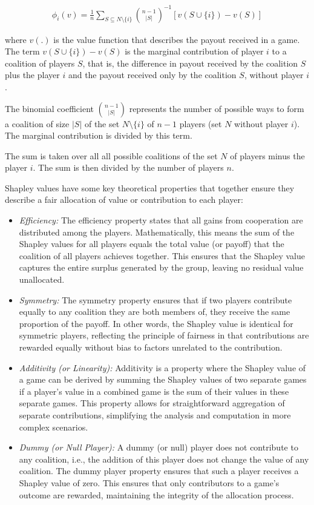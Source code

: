 \begin{align*}
\phi_i(v) = \frac{1}{n} \sum_{S \subseteq N \setminus \{i\}} \binom{n-1}{|S|}^{-1} \left[ v(S \cup \{i\}) - v(S)\right]
\end{align*}

where $v(.)$ is the value function that describes the payout received in a game. The term $v(S \cup \{i\}) - v(S)$ is the marginal contribution of player $i$ to a coalition of players $S$, that is, the difference in payout received by the coalition $S$ plus the player $i$ and the payout received only by the coalition $S$, without player $i$. 

The binomial coefficient $\binom{n-1}{|S|}$ represents the number of possible ways to form a coalition of size $|S|$ of the set $N \setminus \{i\}$ of $n-1$ players (set $N$ without player $i$). The marginal contribution is divided by this term. 

The sum is taken over all all possible coalitions of the set $N$ of players minus the player $i$. The sum is then divided by the number of players $n$.

Shapley values have some key theoretical properties that together ensure they describe a fair allocation of value or contribution to each player:

\begin{itemize}
    \item \emph{Efficiency:}
    The efficiency property states that all gains from cooperation are distributed among the players. Mathematically, this means the sum of the Shapley values for all players equals the total value (or payoff) that the coalition of all players achieves together. This ensures that the Shapley value captures the entire surplus generated by the group, leaving no residual value unallocated.

    \item \emph{Symmetry:}
    The symmetry property ensures that if two players contribute equally to any coalition they are both members of, they receive the same proportion of the payoff. In other words, the Shapley value is identical for symmetric players, reflecting the principle of fairness in that contributions are rewarded equally without bias to factors unrelated to the contribution.

    \item \emph{Additivity (or Linearity):}
    Additivity is a property where the Shapley value of a game can be derived by summing the Shapley values of two separate games if a player's value in a combined game is the sum of their values in these separate games. This property allows for straightforward aggregation of separate contributions, simplifying the analysis and computation in more complex scenarios.

    \item \emph{Dummy (or Null Player):}
    A dummy (or null) player does not contribute to any coalition, i.e., the addition of this player does not change the value of any coalition. The dummy player property ensures that such a player receives a Shapley value of zero. This ensures that only contributors to a game's outcome are rewarded, maintaining the integrity of the allocation process.
\end{itemize}

